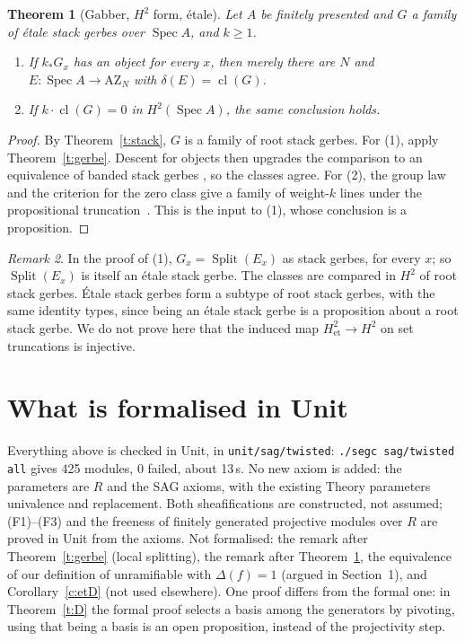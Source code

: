 \documentclass[11pt]{amsart}
\newtheorem{theorem}{Theorem}[section]
\theoremstyle{definition}
\theoremstyle{remark}
\newtheorem{remark}[theorem]{Remark}
\newcommand{\Spec}{\operatorname{Spec}}
\newcommand{\Split}{\operatorname{Split}}
\newcommand{\cl}{\operatorname{cl}}
\newcommand{\code}[1]{\texttt{#1}}
\begin{document}
\begin{theorem}[Gabber, $H^2$ form, \'etale]\label{t:H2}
Let $A$ be finitely presented and $G$ a family of \'etale stack gerbes over
$\Spec A$, and $k\geq1$.
\begin{enumerate}
\item If $k_*G_x$ has an object for every $x$, then merely there are $N$
and $E:\Spec A\to\mathrm{AZ}_N$ with $\delta(E)=\cl(G)$.
\item If $k\cdot\cl(G)=0$ in $H^2(\Spec A)$, the same conclusion holds.
\end{enumerate}
\end{theorem}
\begin{proof}
By Theorem~\ref{t:stack}, $G$ is a family of root stack gerbes. For (1),
apply Theorem~\ref{t:gerbe}. Descent for objects then upgrades the
comparison to an equivalence of banded stack gerbes
\cite[Prop.~4.2]{h2}, so the classes agree. For (2), the group law and
the criterion for the zero class give a family of weight-$k$ lines under
the propositional truncation~\cite[Thm.~5.6]{h2}. This is the input to
(1), whose conclusion is a proposition.
\end{proof}

\begin{remark}
In the proof of (1), $G_x=\Split(E_x)$ as stack gerbes, for every $x$; so
$\Split(E_x)$ is itself an \'etale stack gerbe. The classes are compared in
$H^2$ of root stack gerbes. \'Etale stack gerbes form a subtype of root
stack gerbes, with the same identity types, since being an \'etale stack
gerbe is a proposition about a root stack gerbe. We do not prove here that
the induced map $H^2_{\mathrm{et}}\to H^2$ on set truncations is injective.
\end{remark}

\section{What is formalised in Unit}

Everything above is checked in Unit, in \code{unit/sag/twisted}:
\code{./segc sag/twisted all} gives 425 modules, 0 failed, about 13\,s.
No new axiom is added: the parameters are $R$ and the SAG axioms, with the
existing Theory parameters univalence and replacement. Both sheafifications
are constructed, not assumed; (F1)--(F3) and the freeness of finitely
generated projective modules over $R$ are proved in Unit from the axioms.
Not formalised: the remark after Theorem~\ref{t:gerbe} (local
splitting), the remark after Theorem~\ref{t:H2}, the equivalence of our
definition of unramifiable with $\Delta(f)=1$ (argued in Section~1), and
Corollary~\ref{c:etD} (not used elsewhere). One proof differs from the
formal one: in Theorem~\ref{t:D} the formal proof selects
a basis among the generators by pivoting, using that being a basis is an
open proposition, instead of the projectivity step.
\end{document}
